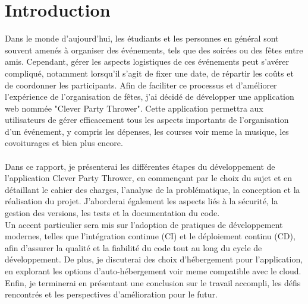 \section{Introduction}\label{sec:introduction}

Dans le monde d'aujourd'hui, les étudiants et les personnes en général sont souvent amenés à organiser des événements, tels que des soirées ou des fêtes entre amis.
Cependant, gérer les aspects logistiques de ces événements peut s'avérer compliqué, notamment lorsqu'il s'agit de fixer une date, de répartir les coûts et de coordonner les participants.
Afin de faciliter ce processus et d'améliorer l'expérience de l'organisation de fêtes, j'ai décidé de développer une application web nommée "Clever Party Thrower".
Cette application permettra aux utilisateurs de gérer efficacement tous les aspects importants de l'organisation d'un événement,
y compris les dépenses, les courses voir meme la musique, les covoiturages et bien plus encore.\\\\

Dans ce rapport, je présenterai les différentes étapes du développement de l'application Clever Party Thrower,
en commençant par le choix du sujet et en détaillant le cahier des charges, l'analyse de la problématique, la conception et la réalisation du projet.
J'aborderai également les aspects liés à la sécurité, la gestion des versions, les tests et la documentation du code.\\
Un accent particulier sera mis sur l'adoption de pratiques de développement modernes, telles que l'intégration continue (CI) et le déploiement continu (CD), afin d'assurer la qualité et la fiabilité du code tout au long du cycle de développement.
De plus, je discuterai des choix d'hébergement pour l'application, en explorant les options d'auto-hébergement voir meme compatible avec le cloud.\\

Enfin, je terminerai en présentant une conclusion sur le travail accompli, les défis rencontrés et les perspectives d'amélioration pour le futur.